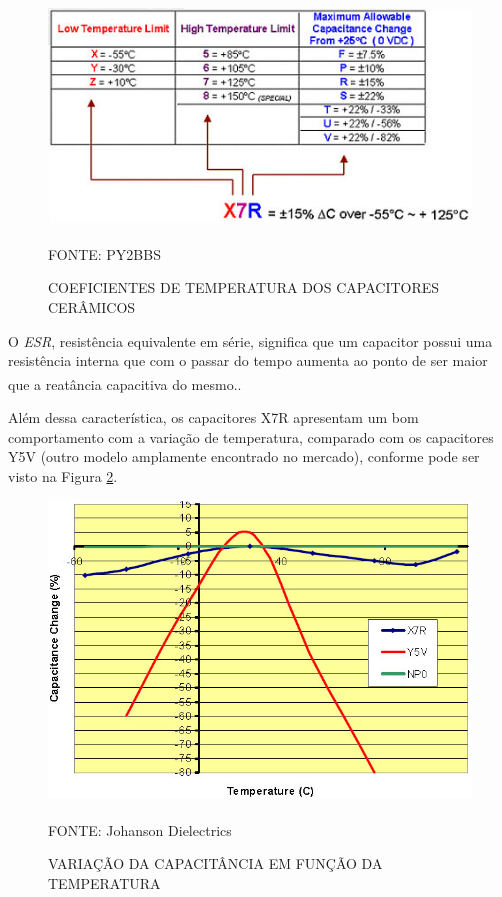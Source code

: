 \documentclass[
	12pt,				%
	openright,			%
	oneside,			%
	a4paper,			%
	english,			%
	french,				%
	spanish,			%
	brazil,				%
	oldfontcommands
	]{abntex2}
\begin{document}
	\begin{figure}[th]
		\caption{COEFICIENTES DE TEMPERATURA DOS CAPACITORES CERÂMICOS}
		\label{Fig_Cap}
		\centering
		\includegraphics[width=0.8\linewidth]{./figs/x7r}
			
		\begin{small}
			FONTE: PY2BBS\textsuperscript{\cite{x7r}}
		\end{small}		
	\end{figure}	
	\pagebreak
	
	O \textit{ESR}, resistência equivalente em série, significa que um capacitor possui uma resistência interna que com o passar do tempo aumenta ao ponto de ser maior que a reatância capacitiva do mesmo.\textsuperscript{\cite{esr}}.
		
	Além dessa característica, os capacitores X7R apresentam um bom comportamento com a variação de temperatura, comparado com os capacitores Y5V (outro modelo amplamente encontrado no mercado), conforme pode ser visto na Figura \ref{Fig_Cap_Temp}.
	
	\begin{figure}[th]
		\caption{VARIAÇÃO DA CAPACITÂNCIA EM FUNÇÃO DA TEMPERATURA}
		\label{Fig_Cap_Temp}
		\centering
		\includegraphics[width=0.8\linewidth]{./figs/y5v}
			
		\begin{small}
			FONTE: Johanson Dielectrics\textsuperscript{\cite{y5v}}
		\end{small}		
	\end{figure}
	\pagebreak
\end{document}
